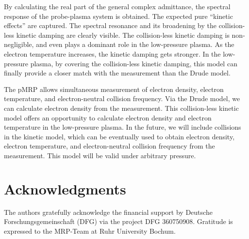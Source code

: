 \documentclass[superscriptaddress,preprint]{revtex4}  %
\begin{document}
By calculating the real part of the general complex admittance, the spectral response of the probe-plasma system is obtained. The expected pure ``kinetic effects'' are captured. The spectral resonance and its broadening by the collision-less kinetic damping are clearly visible. The collision-less kinetic damping is non-negligible, and even plays a dominant role in the low-pressure plasma. As the electron temperature increases, the kinetic damping gets stronger. In the low-pressure plasma, by covering the collision-less kinetic damping, this model can finally provide a closer match with the measurement than the Drude model. 

The pMRP allows simultaneous measurement of electron density, electron temperature, and electron-neutral collision frequency. Via the Drude model, we can calculate electron density from the measurement. This collision-less kinetic model offers an opportunity to calculate electron density and electron temperature in the low-pressure plasma. In the future, we will include collisions in the kinetic model, which can be eventually used to obtain electron density, electron temperature, and electron-neutral collision frequency from the measurement. This model will be valid under arbitrary pressure. 



\pagebreak

\section{Acknowledgments}

The authors gratefully acknowledge the financial support by Deutsche Forschungsgemeinschaft (DFG) via the project DFG 360750908. Gratitude is expressed to the MRP-Team at Ruhr University Bochum.
\end{document}
